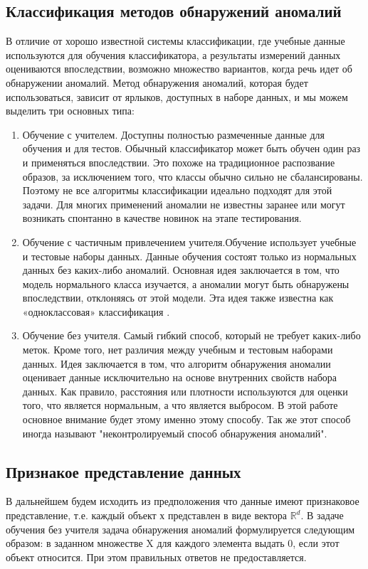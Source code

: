 \subsection{Классификация методов обнаружений аномалий}
В отличие от хорошо известной  системы классификации, где учебные данные используются для обучения классификатора, а результаты измерений данных оцениваются впоследствии, возможно множество вариантов, когда речь идет об обнаружении аномалий. Метод обнаружения аномалий, которая будет использоваться, зависит от ярлыков, доступных в наборе данных, и мы можем выделить три основных типа:
\begin{enumerate}
\item Обучение с учителем. Доступны полностью размеченные данные для обучения и для тестов. Обычный классификатор может быть обучен один раз и применяться впоследствии. Это похоже на традиционное распозвание образов, за исключением того, что классы обычно сильно не сбалансированы. Поэтому не все алгоритмы классификации идеально подходят для этой задачи. Для многих применений аномалии не известны заранее или могут возникать спонтанно в качестве новинок на этапе тестирования.
\item Обучение с частичным привлечением учителя.Обучение использует учебные и тестовые наборы данных. Данные обучения состоят только из нормальных данных без каких-либо аномалий. Основная идея заключается в том, что модель нормального класса изучается, а аномалии могут быть обнаружены впоследствии, отклоняясь от этой модели. Эта идея также известна как «одноклассовая» классификация \cite{Book03}.
\item Обучение без учителя.
Самый гибкий способ, который не требует каких-либо меток. Кроме того, нет различия между учебным и тестовым наборами данных. Идея заключается в том, что алгоритм обнаружения аномалии оценивает данные исключительно на основе внутренних свойств набора данных. Как правило, расстояния или плотности используются для оценки того, что является нормальным, а что является выбросом. В этой работе основное внимание будет этому  именно этому способу. Так же этот способ иногда называют "неконтролируемый способ обнаружения  аномалий".
\end{enumerate}
\subsection{Признакое представление данных}
В дальнейшем будем исходить из предположения что  данные имеют признаковое представление, т.е. каждый объект х  представлен в виде вектора $\mathbb{R}^d$. В задаче обучения без учителя задача обнаружения аномалий  формулируется следующим образом: в заданном множестве X для каждого элемента выдать 0, если этот объект относится. При этом правильных ответов не предоставляется.

